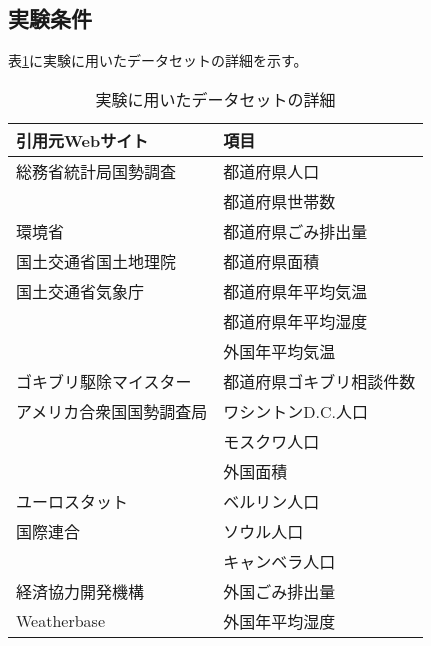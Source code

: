\documentclass[a4paper,10pt,twocolumn]{jsarticle}
\begin{document}
\subsection{実験条件}
表\ref{table:data}に実験に用いたデータセットの詳細を示す。
\begin{table}[h]
 \caption{実験に用いたデータセットの詳細}
 \label{table:data}
 \centering
  \begin{tabular}{ll}
   \hline
	 \hline
	 引用元Webサイト & 項目 \\
   \hline \hline
	 総務省統計局国勢調査\cite{soumu} & 都道府県人口 \\
	 & 都道府県世帯数 \\
	 \hline
	 環境省\cite{kankyo} & 都道府県ごみ排出量 \\
	 \hline
	 国土交通省国土地理院\cite{kokudokoutukokudotiri} & 都道府県面積 \\
	 \hline
	 国土交通省気象庁\cite{kokudokoutukisyou} & 都道府県年平均気温 \\
	 & 都道府県年平均湿度 \\
	 & 外国年平均気温 \\
	 \hline
   ゴキブリ駆除マイスター\cite{cockroach} & 都道府県ゴキブリ相談件数 \\
	 \hline
	 アメリカ合衆国国勢調査局\cite{usa} & ワシントンD.C.人口 \\
	 & モスクワ人口 \\
	 & 外国面積 \\
	 \hline
	 ユーロスタット\cite{euro} & ベルリン人口 \\
	 \hline
	 国際連合\cite{un} & ソウル人口 \\
	 & キャンベラ人口 \\
	 \hline
	 経済協力開発機構\cite{oecd} & 外国ごみ排出量 \\
	 \hline
	 Weatherbase\cite{weather} & 外国年平均湿度 \\
	 \hline
   \hline
  \end{tabular}
\end{table}
\end{document}
